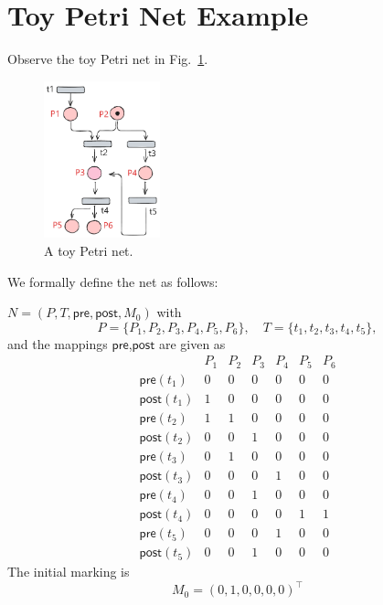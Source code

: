 

\section{Toy Petri Net Example}
\label{appendix:toyPN}

Observe the toy Petri net in Fig.~\ref{fig:toyPN}.

\begin{figure}[H]
	\centering
	\includegraphics[width=0.3\textwidth]{plots/toy_PN_example.pdf}
	\caption{A toy Petri net.}
	\label{fig:toyPN}
\end{figure}



We formally define the net as follows:

 \(N=(P,T,\mathsf{pre},\mathsf{post},M_0)\) with
\[
P=\{P_1,P_2,P_3,P_4,P_5,P_6\},\quad
T=\{t_1,t_2,t_3,t_4,t_5\},
\]
and the mappings $\mathsf{pre}$,$\mathsf{post}$ are given as
\[
\begin{array}{c|cccccc}
	& P_1 & P_2 & P_3 & P_4 & P_5 & P_6 \\ \hline
	\mathsf{pre}(t_1)  & 0 & 0 & 0 & 0 & 0 & 0 \\
	\mathsf{post}(t_1) & 1 & 0 & 0 & 0 & 0 & 0 \\ \hline
	\mathsf{pre}(t_2)  & 1 & 1 & 0 & 0 & 0 & 0 \\
	\mathsf{post}(t_2) & 0 & 0 & 1 & 0 & 0 & 0 \\ \hline
	\mathsf{pre}(t_3)  & 0 & 1 & 0 & 0 & 0 & 0 \\
	\mathsf{post}(t_3) & 0 & 0 & 0 & 1 & 0 & 0 \\ \hline
	\mathsf{pre}(t_4)  & 0 & 0 & 1 & 0 & 0 & 0 \\
	\mathsf{post}(t_4) & 0 & 0 & 0 & 0 & 1 & 1 \\ \hline
	\mathsf{pre}(t_5)  & 0 & 0 & 0 & 1 & 0 & 0 \\
	\mathsf{post}(t_5) & 0 & 0 & 1 & 0 & 0 & 0
\end{array}
\]
The initial marking is
\[
M_0 = (0,1,0,0,0,0)^\top 
\]

